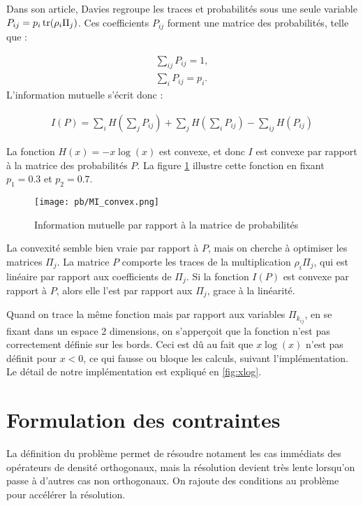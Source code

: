 Dans son article, Davies regroupe les traces et probabilités sous une seule variable $P_{ij} = p_i \operatorname{tr}(\rho_i \Pi_j)$. Ces coefficients $P_{ij}$ forment une matrice des probabilités, telle que :

\begin{align}
    \displaystyle \sum_{ij} P_{ij} = 1, \\
    \displaystyle \sum_{i}  P_{ij} = p_i.
\end{align}
L'information mutuelle s'écrit donc :

\begin{align}
    I(P) = \displaystyle \sum_{i} H(\displaystyle \sum_{j}P_{ij}) + \displaystyle \sum_{j} H(\displaystyle \sum_{i}P_{ij}) -  \displaystyle \sum_{ij} H(P_{ij}) 
\end{align}

La fonction $H(x) = -x \log(x)$ est convexe, et donc $I$ est convexe par rapport à la matrice des probabilités $P$. La figure \ref{fig:mi_convex} illustre cette fonction en fixant $p_1 = 0.3$ et $p_2 = 0.7$.

\begin{figure}[h]
    \centering
    \texttt{[image: pb/MI\_convex.png]}
    \caption{Information mutuelle par rapport à la matrice de probabilités}
    \label{fig:mi_convex}
\end{figure}

La convexité semble bien vraie par rapport à $P$, mais on cherche à optimiser les matrices $\Pi_j$. La matrice $P$ comporte les traces de la multiplication $\rho_i \Pi_j$, qui est linéaire par rapport aux coefficients de $\Pi_j$. Si la fonction $I(P)$ est convexe par rapport à $P$, alors elle l'est par rapport aux $\Pi_j$, grace à la linéarité.

Quand on trace la même fonction mais par rapport aux variables $\Pi_{k_{ij}}$, en se fixant dans un espace 2 dimensions, on s'apperçoit que la fonction n'est pas correctement définie sur les bords. Ceci est dû au fait que $x\log(x)$ n'est pas définit pour $x < 0$, ce qui fausse ou bloque les calculs, suivant l'implémentation. Le détail de notre implémentation est expliqué en \ref{fig:xlog}. %

\medbreak

\section{Formulation des contraintes}

La définition du problème permet de résoudre notament les cas immédiats des opérateurs de densité orthogonaux, mais la résolution devient très lente lorsqu'on passe à d'autres cas non orthogonaux. On rajoute des conditions au problème pour accélérer la résolution.

